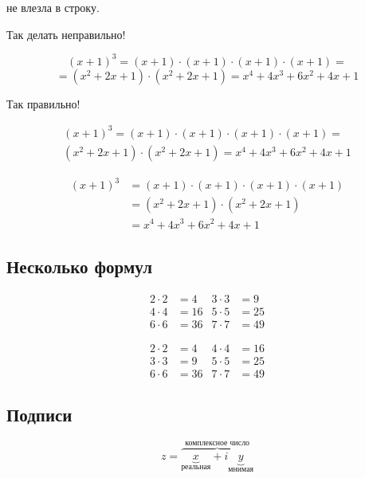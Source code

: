 \documentclass[12pt, a4paper]{article}
\begin{document}
не влезла в строку.


Так делать неправильно!

\[  (x+1)^3 = (x+1) \cdot (x+1) \cdot (x+1) \cdot (x+1) = \]
\[= (x^2 + 2x + 1) \cdot (x^2 + 2x + 1) = x^4 + 4x^3 + 6x^2 + 4x+ 1 \]

Так правильно!

\begin{multline}
	(x+1)^3 = (x+1) \cdot (x+1) \cdot (x+1) \cdot (x+1) = \\
	(x^2 + 2x + 1) \cdot (x^2 + 2x + 1) = x^4 + 4x^3 + 6x^2 + 4x+ 1
\end{multline}


\begin{align*}
	(x+1)^3 & = (x+1) \cdot (x+1) \cdot (x+1) \cdot (x+1) \\
	        & = (x^2 + 2x + 1)  \cdot (x^2 + 2x + 1)    \\
	        & =  x^4 + 4x^3 + 6x^2 + 4x+ 1
\end{align*}


\subsection{Несколько формул}

\begin{align}
	2 \cdot 2 &= 4 & 3  \cdot 3 &= 9 \\
	4 \cdot 4 &= 16 & 5 \cdot 5 &= 25 \\
	6 \cdot 6 &= 36 & 7 \cdot 7 &= 49
\end{align}

\begin{equation}
	\begin{aligned}
		2 \cdot 2 &= 4 & 4 \cdot 4 &= 16 \\
		3 \cdot 3 &= 9 & 5 \cdot 5 &= 25 \\
		6 \cdot 6 &= 36 & 7 \cdot 7 &= 49
	\end{aligned}
\end{equation}




\subsection{Подписи}

\[
 z = \overbrace{
   \underbrace{x}_\text{реальная} + i
   \underbrace{y}_\text{мнимая}
  }^\text{комплексное число}
\]
\end{document}
